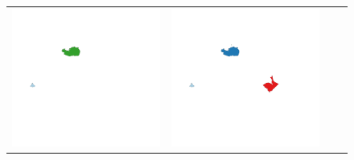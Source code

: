 \begin{figure}[p]
\begin{tabularx}{1\textwidth}{XXXX}
\includegraphics[width=1\linewidth]{images/ch6/contig/01}&
\includegraphics[width=1\linewidth]{images/ch6/contig/02}&

\end{tabularx}
\end{figure}
